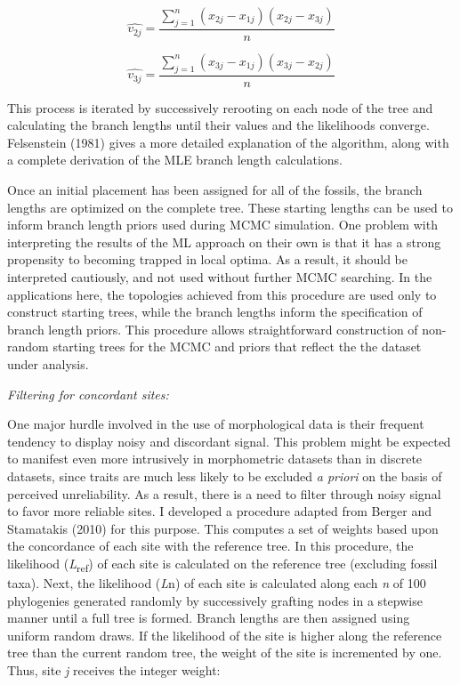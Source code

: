 \documentclass[12pt]{article}
\begin{document}
\begin{equation}
 \hat{v_{2j}} =   \frac{\sum\limits_{j=1}^{n}(x_{2j}- x_{1j}) (x_{2j} - x_{3j})}{n} 
\end{equation}

\begin{equation}
\hat{v_{3j}} =   \frac{\sum\limits_{j=1}^{n}(x_{3j}- x_{1j}) (x_{3j} - x_{2j})}{n}
\end{equation}


This process is iterated by successively rerooting on each node of the
tree and calculating the branch lengths until their values and the
likelihoods converge. Felsenstein (1981) gives a more detailed
explanation of the algorithm, along with a complete derivation of the MLE branch length calculations.

Once an initial placement has been assigned for  all of the fossils,
the branch lengths are optimized on the complete tree. These starting lengths can be used to inform branch
length priors used during MCMC simulation. One problem with interpreting
the results of the ML approach on their own is that it has a strong
propensity to becoming trapped in local optima. As a result, it should be
interpreted cautiously, and not used without further MCMC searching. In the
applications here, the topologies achieved from this procedure are
used only to construct  starting trees, while the branch
lengths inform the specification of branch length priors. This procedure
allows straightforward construction of non-random starting trees for the
MCMC and priors that reflect the the dataset under analysis.

\emph{Filtering for concordant sites:}

One major hurdle involved in the use of morphological data is their
frequent tendency to display noisy and discordant signal. This problem
might be expected to manifest even more intrusively in morphometric
datasets than in discrete datasets, since traits are much less likely to
be excluded \emph{a priori} on the basis of perceived unreliability. As
a result, there is a need to filter through noisy signal to favor more
reliable sites. I developed a procedure adapted from Berger and
Stamatakis (2010) for this purpose. This computes a set of weights based
upon the concordance of each site with the reference tree. In this
procedure, the likelihood (\emph{L}\textsubscript{ref}) of each site is calculated on
the reference tree (excluding fossil taxa). Next, the likelihood
(\emph{L}n) of each site is calculated along each \emph{n} of 100
 phylogenies generated randomly by  successively grafting nodes in a stepwise manner
 until a full tree is formed. Branch lengths are then assigned using uniform random draws.
  If the likelihood of the site is higher along the reference tree than the current random tree, the weight of the
site is incremented by one. Thus, site \emph{j} receives the integer
weight:
\end{document}
